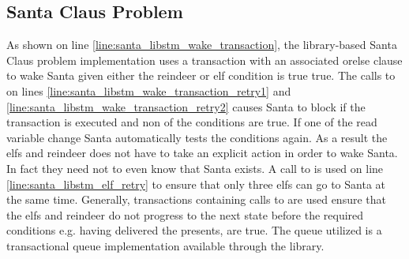 \subsection{Santa Claus Problem}
As shown on line \ref{line:santa_libstm_wake_transaction}, the library-based Santa Claus problem implementation uses a transaction with an associated orelse clause to wake Santa given either the reindeer or elf condition is true true. The calls to  on lines \ref{line:santa_libstm_wake_transaction_retry1} and \ref{line:santa_libstm_wake_transaction_retry2} causes Santa to block if the transaction is executed and non of the conditions are true. If one of the read variable change Santa automatically tests the conditions again. As a result the elfs and reindeer does not have to take an explicit action in order to wake Santa. In fact they need not to even know that Santa exists. A call to  is used on line \ref{line:santa_libstm_elf_retry} to ensure that only three elfs can go to Santa at the same time. Generally, transactions containing calls to  are used ensure that the elfs and reindeer do not progress to the next state before the required conditions e.g. having delivered the presents, are true. The queue utilized is a transactional queue implementation available through the  library.
